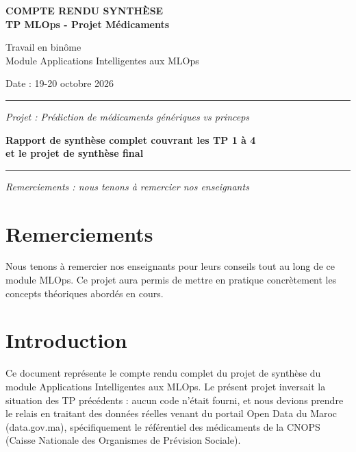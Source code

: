 \documentclass[12pt,a4paper]{report}
\begin{document}
\begin{titlepage}
\begin{center}
    \vspace{2cm}
    
    {\LARGE \bfseries COMPTE RENDU SYNTHÈSE \\
    TP MLOps - Projet Médicaments}
    
    \vspace{1.5cm}
    
    {\large Travail en binôme \\
    Module Applications Intelligentes aux MLOps}
    
    \vspace{1cm}
    {\large Date : 19-20 octobre 2026}
    
    \vspace{2cm}
    {\rule{0.8\textwidth}{1.5pt}}
    \vspace{1cm}
    {\large \textit{Projet : Prédiction de médicaments génériques vs princeps}}
    
    \vfill
    
    {\large \textbf{Rapport de synthèse complet couvrant les TP 1 à 4 \\
    et le projet de synthèse final}}
    
    \vspace{1cm}
    {\rule{0.8\textwidth}{1.5pt}}
    \vspace{1cm}
    {\large \textit{Remerciements : nous tenons à remercier nos enseignants}}
    
    \end{center}
\end{titlepage}

\chapter*{Remerciements}
Nous tenons à remercier nos enseignants pour leurs conseils tout au long de ce module MLOps. Ce projet aura permis de mettre en pratique concrètement les concepts théoriques abordés en cours.

\chapter{Introduction}

Ce document représente le compte rendu complet du projet de synthèse du module Applications Intelligentes aux MLOps. Le présent projet inversait la situation des TP précédents : aucun code n'était fourni, et nous devions prendre le relais en traitant des données réelles venant du portail Open Data du Maroc (data.gov.ma), spécifiquement le référentiel des médicaments de la CNOPS (Caisse Nationale des Organismes de Prévision Sociale).
\end{document}
